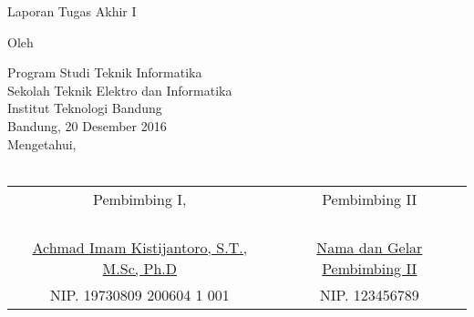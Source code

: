 \clearpage
\pagestyle{empty}

\begin{center}
\smallskip

    \Large \bfseries \MakeUppercase{\thetitle}
    \vfill

    \Large Laporan Tugas Akhir I
    \vfill

    \large Oleh

    \Large \theauthor

    \large Program Studi Teknik Informatika \\
    Sekolah Teknik Elektro dan Informatika \\
    Institut Teknologi Bandung \\

    \vfill
    \normalsize \normalfont
    Bandung, 20 Desember 2016 \\
    Mengetahui, \\~\\    

    \setlength{\tabcolsep}{12pt}
    \begin{tabular}{c@{\hskip 0.5in}c}
        Pembimbing I, & Pembimbing II \\
        & \\
        & \\
        & \\
        & \\
        \underline{Achmad Imam Kistijantoro, S.T., M.Sc, Ph.D} & \underline{Nama dan Gelar Pembimbing II} \\
        NIP. 19730809 200604 1 001 & NIP. 123456789 \\
    \end{tabular}

\end{center}
\clearpage
